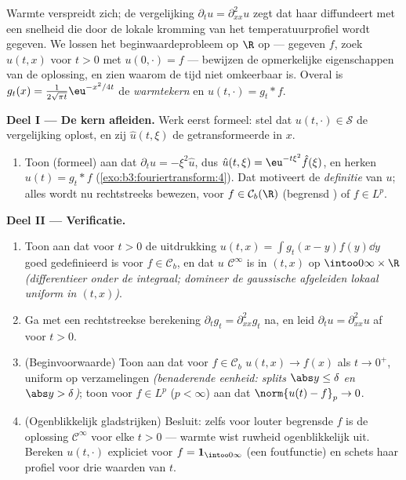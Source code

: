 \begin{problem}[{Weekendopgave --- $\partial_tu =
\partial^2_{xx}u$, van begin tot eind opgelost}]
\label{pb:b3:fouriertransform:1}
Warmte verspreidt zich; de vergelijking $\partial_tu =
\partial_{xx}^2u$ zegt dat haar  diffundeert met een
snelheid die door de lokale kromming van het temperatuurprofiel
wordt gegeven. We lossen het beginwaardeprobleem op $\R$ op ---
gegeven $f$, zoek $u(t, x)$ voor $t > 0$ met $u(0, \cdot) = f$
--- bewijzen de opmerkelijke eigenschappen van de oplossing, en
zien waarom de tijd niet omkeerbaar is. Overal is $g_t(x) =
\frac1{2\sqrt{\pi t}}\eu^{-x^2/4t}$ de
\emph{warmtekern} en $u(t, \cdot) = g_t * f$.

\medskip
\noindent\textbf{Deel I --- De kern afleiden.} Werk eerst
formeel: stel dat $u(t, \cdot) \in \mathcal S$ de vergelijking
oplost, en zij $\hat u(t, \xi)$ de getransformeerde in $x$.
\begin{enumerate}
  \item Toon (formeel) aan dat $\partial_t\hat u = -\xi^2\hat u$,
        dus $\hat u(t,\xi) = \eu^{-t\xi^2}\hat f(\xi)$, en herken
        $u(t) = g_t * f$ (\cref{exo:b3:fouriertransform:4}). Dat
        motiveert de \emph{definitie} van $u$; alles wordt nu
        rechtstreeks bewezen, voor $f \in \mathcal C_b(\R)$
        (begrensd ) of $f \in L^p$.
\end{enumerate}

\medskip
\noindent\textbf{Deel II --- Verificatie.}
\begin{enumerate}[resume]
  \item Toon aan dat voor $t > 0$ de uitdrukking $u(t, x) = \int
        g_t(x-y)f(y)\dd y$ goed gedefinieerd is voor $f \in
        \mathcal C_b$, en dat $u$ $\mathcal C^\infty$ is in $(t,
        x)$ op $\intoo0\infty\times\R$ \emph{(differentieer onder
        de integraal; domineer de gaussische afgeleiden lokaal
        uniform in $(t,x)$)}.
  \item Ga met een rechtstreekse berekening $\partial_tg_t =
        \partial^2_{xx}g_t$ na, en leid $\partial_tu =
        \partial^2_{xx}u$ af voor $t > 0$.
  \item (Beginvoorwaarde) Toon aan dat voor $f \in \mathcal C_b$
        $u(t, x) \to f(x)$ als $t \to 0^+$, uniform op 
        verzamelingen \emph{(benaderende eenheid: splits $\abs y
        \leq \delta$ en $\abs y > \delta$)}; toon voor $f \in
        L^p$ ($p < \infty$) aan dat $\norm{u(t) - f}_p \to 0$.
  \item (Ogenblikkelijk gladstrijken) Besluit: zelfs voor louter
        begrensde  $f$ is de oplossing $\mathcal C^\infty$
        voor elke $t > 0$ --- warmte wist ruwheid ogenblikkelijk
        uit. Bereken $u(t, \cdot)$ expliciet voor $f = \mathbf
        1_{\intoo0\infty}$ (een foutfunctie) en schets haar
        profiel voor drie waarden van $t$.
\end{enumerate}


\end{problem}
